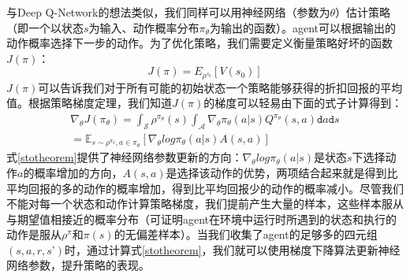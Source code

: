 与Deep Q-Network的想法类似，我们同样可以用神经网络（参数为$\theta$）估计策略（即一个以状态$s$为输入、动作概率分布$\pi_\theta$为输出的函数）。agent可以根据输出的动作概率选择下一步的动作。为了优化策略，我们需要定义衡量策略好坏的函数$J(\pi)$：
\begin{equation}
J(\pi) = E_{\rho^{s_0}}[V(s_0)]
\end{equation}
$J(\pi)$可以告诉我们对于所有可能的初始状态一个策略能够获得的折扣回报的平均值。根据策略梯度定理\cite{sutton1999policy}，我们知道$J(\pi)$的梯度可以轻易由下面的式子计算得到：
\begin{equation}
\begin{split}
\nabla_\theta J(\pi_\theta) = \int_\mathcal{S}\rho^{\pi_\theta}(s)\int_\mathcal{A}\nabla_\theta \pi_\theta(a\vert s)Q^{\pi_\theta}(s,a) \texttt{d}a\texttt{d}s \\  = \mathbb{E}_{s\sim \rho^{\pi_\theta},a\in \pi_\theta}[\nabla_\theta log \pi_\theta(a\vert s)A(s,a)]
\end{split}
\label{stotheorem}
\end{equation}
式\ref{stotheorem}提供了神经网络参数更新的方向：$\nabla_\theta log \pi_\theta(a\vert s)$是状态$s$下选择动作$a$的概率增加的方向，$A(s,a)$是选择该动作的优势，两项结合起来就是得到比平均回报的多的动作的概率增加，得到比平均回报少的动作的概率减小。尽管我们不能对每一个状态和动作计算策略梯度，我们提前产生大量的样本，这些样本服从与期望值相接近的概率分布（可证明agent在环境中运行时所遇到的状态和执行的动作是服从$\rho^\pi$和$\pi(s)$的无偏差样本）。当我们收集了agent的足够多的四元组$(s,a,r,s’)$时，通过计算式\ref{stotheorem}，我们就可以使用梯度下降算法更新神经网络参数，提升策略的表现。
